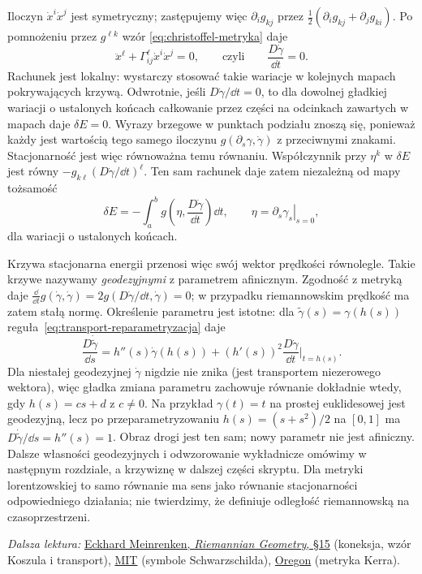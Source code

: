 Iloczyn $\dot x^i\dot x^j$ jest symetryczny;
zastępujemy więc $\partial_i g_{kj}$ przez
$\tfrac12(\partial_i g_{kj}+\partial_jg_{ki})$.
Po pomnożeniu przez $g^{\ell k}$ wzór
\eqref{eq:christoffel-metryka} daje
\begin{equation}\label{eq:rownanie-geodezyjnej-zapowiedz}
 \ddot x^\ell+\Gamma^\ell_{ij}\dot x^i\dot x^j=0,
 \qquad\text{czyli}\qquad
 \frac{D\dot\gamma}{\dd t}=0.
\end{equation}
Rachunek jest lokalny: wystarczy stosować takie wariacje
w kolejnych mapach pokrywających krzywą. Odwrotnie,
jeśli $D\dot\gamma/\dd t=0$, to dla dowolnej gładkiej
wariacji o ustalonych końcach całkowanie przez części
na odcinkach zawartych w mapach daje $\delta E=0$.
Wyrazy brzegowe w punktach podziału znoszą się, ponieważ
każdy jest wartością tego samego iloczynu
$g(\partial_s\gamma,\dot\gamma)$ z przeciwnymi znakami.
Stacjonarność jest więc równoważna temu równaniu.
Współczynnik przy $\eta^k$ w $\delta E$ jest równy
$-g_{k\ell}(D\dot\gamma/\dd t)^\ell$.
Ten sam rachunek daje zatem niezależną od mapy tożsamość
\begin{equation}\label{eq:pierwsza-wariacja-koneksja}
 \delta E
 =-\int_a^b
    g\!\left(\eta,\frac{D\dot\gamma}{\dd t}\right)\dd t,
 \qquad \eta=\left.\partial_s\gamma_s\right|_{s=0},
\end{equation}
dla wariacji o ustalonych końcach.

Krzywa stacjonarna energii przenosi więc
swój wektor prędkości równolegle. Takie krzywe
nazywamy \emph{geodezyjnymi} z parametrem
afinicznym. Zgodność z metryką daje
$\frac{\dd}{\dd t}g(\dot\gamma,\dot\gamma)
=2g(D\dot\gamma/\dd t,\dot\gamma)=0$;
w przypadku riemannowskim prędkość ma zatem stałą normę.
Określenie parametru jest istotne: dla $\widetilde\gamma(s)
=\gamma(h(s))$ reguła~\eqref{eq:transport-reparametryzacja} daje
\[
 \frac{D\dot{\widetilde\gamma}}{\dd s}
 =h''(s)\dot\gamma(h(s))
       +(h'(s))^2\frac{D\dot\gamma}{\dd t}\bigg|_{t=h(s)}.
\]
Dla niestałej geodezyjnej $\dot\gamma$ nigdzie nie znika
(jest transportem niezerowego wektora), więc gładka
zmiana parametru zachowuje równanie dokładnie wtedy,
gdy $h(s)=cs+d$ z $c\ne0$.
Na przykład $\gamma(t)=t$ na prostej euklidesowej jest
geodezyjną, lecz po przeparametryzowaniu
$h(s)=(s+s^2)/2$ na $[0,1]$ ma
$D\dot{\widetilde\gamma}/\dd s=h''(s)=1$.
Obraz drogi jest ten sam; nowy parametr nie jest afiniczny.
Dalsze własności geodezyjnych i odwzorowanie
wykładnicze omówimy w następnym rozdziale,
a krzywiznę w dalszej części skryptu. Dla metryki lorentzowskiej
to samo równanie ma sens jako równanie
stacjonarności odpowiedniego działania;
nie twierdzimy, że definiuje odległość
riemannowską na czasoprzestrzeni.

\par\smallskip
{\footnotesize\noindent\emph{Dalsza lektura:}
\href{https://www.math.toronto.edu/mein/teaching/LectureNotes/rieall.pdf}
{Eckhard Meinrenken, \emph{Riemannian Geometry}, \S15}
(koneksja, wzór Koszula i transport),
\href{https://web.mit.edu/8.962/www/lecnotes/8_962TA-lec-all.pdf}
{MIT} (symbole Schwarzschilda),
\href{https://sites.science.oregonstate.edu/coursewikis/GGR/book/content/kerr}
{Oregon} (metryka Kerra).\par}
